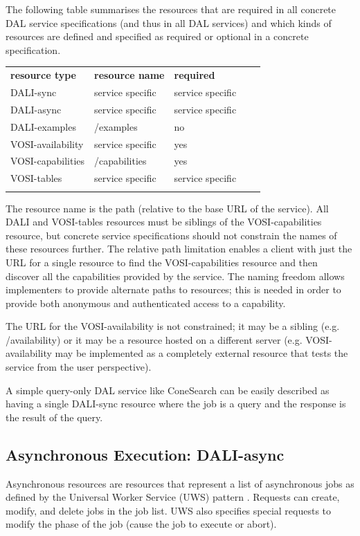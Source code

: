 \documentclass[11pt,letter]{ivoa}
\begin{document}
The following table summarises the resources that are required in all concrete 
DAL service specifications (and thus in all DAL services) and which kinds of 
resources are defined and specified as required or optional in a concrete 
specification.


\begin{tabular}{l l l l l}
\sptablerule
\textbf{resource type} & \textbf{resource name} & \textbf{required} \\
\sptablerule
DALI-sync & service specific & service specific & \\
DALI-async & service specific & service specific & \\
DALI-examples & /examples & no & \\
VOSI-availability & service specific & yes & \\
VOSI-capabilities & /capabilities & yes & \\
VOSI-tables & service specific & service specific & \\
\sptablerule
\label{tab:resources}
\end{tabular}

The resource name is the path (relative to the base URL of the service). All 
DALI and VOSI-tables resources must be siblings of the VOSI-capabilities resource, but 
concrete service specifications should not constrain the names of these resources further.
The relative path limitation enables a client with just the URL for a single resource to 
find the VOSI-capabilities resource and then discover all the capabilities 
provided by the service. The naming freedom allows implementers to provide alternate paths to 
resources; this is needed in order to provide both anonymous and authenticated access to a 
capability. 

The URL for the VOSI-availability is not constrained; it may be a sibling (e.g. /availability) 
or it may be a resource hosted on a different server (e.g. VOSI-availability 
may be implemented as a 
completely external resource that tests the service from the user perspective).

A simple query-only DAL service like ConeSearch can be easily described as 
having a single DALI-sync resource where the job is a query and the response is 
the result of the query. 

\subsection{Asynchronous Execution: DALI-async}
\label{sec:dali-async}
Asynchronous resources are resources that represent a list of asynchronous jobs 
as defined by the Universal Worker Service (UWS) pattern \citep{std:UWS}. 
Requests can 
create, modify, and delete jobs in the job list. UWS also specifies special 
requests to modify the phase of the job (cause the job to execute or abort).
\end{document}
